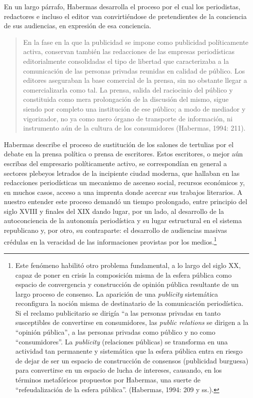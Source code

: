 En un largo párrafo, Habermas desarrolla el proceso por el cual los periodistas, redactores e incluso el editor van convirtiéndose de pretendientes de la conciencia de sus audiencias, en expresión de esa conciencia.

\begin{quote}
	En la fase en la que la publicidad se impone como publicidad políticamente activa, conservan también las redacciones de las empresas periodísticas editorialmente consolidadas el tipo de libertad que caracterizaba a la comunicación de las personas privadas reunidas en calidad de público. Los editores aseguraban la base comercial de la prensa, sin no obstante llegar a comercializarla como tal. La prensa, salida del raciocinio del público y constituida como mera prolongación de la discusión del mismo, sigue siendo por completo una institución de ese público; a modo de mediador y vigorizador, no ya como mero órgano de transporte de información, ni instrumento aún de la cultura de los consumidores (Habermas, 1994: 211).
\end{quote}


Habermas describe el proceso de sustitución de los salones de tertulias por el debate en la prensa política o prensa de escritores. Estos escritores, o mejor aún escribas del empresario políticamente activo, se correspondían en general a sectores plebeyos letrados de la incipiente ciudad moderna, que hallaban en las redacciones periodísticas un mecanismo de ascenso social, recursos económicos y, en muchos casos, acceso a una imprenta donde acercar sus trabajos literarios. A nuestro entender este proceso demandó un tiempo prolongado, entre principio del siglo XVIII y finales del XIX dando lugar, por un lado, al desarrollo de la autoconciencia de la autonomía periodística y su lugar estructural en el sistema republicano y, por otro, su contraparte: el desarrollo de audiencias masivas crédulas en la veracidad de las informaciones provistas por los medios.\footnote{Este fenómeno habilitó otro problema fundamental,  a lo largo del siglo XX, capaz de poner en crisis la composición misma de la esfera pública como espacio de convergencia y construcción de opinión pública resultante de un largo proceso de consenso. La aparición de una \emph{publicity} sistemática reconfigura la noción misma de destinatario de la comunicación periodística. Si el reclamo publicitario se dirigía “a las personas privadas en tanto susceptibles de convertirse en consumidores, las \emph{public relations} se dirigen a la “opinión pública”, a las personas privadas como público y no como “consumidores”. La \emph{publicity} (relaciones públicas) se transforma en una actividad tan permanente y sistemática que la esfera pública entra en riesgo de dejar de ser un espacio de construcción de consensos (publicidad burguesa) para convertirse en un espacio de lucha de intereses, causando, en los términos metafóricos propuestos por Habermas, una suerte de “refeudalización de la esfera pública”. (Habermas, 1994: 209 y ss.).}

